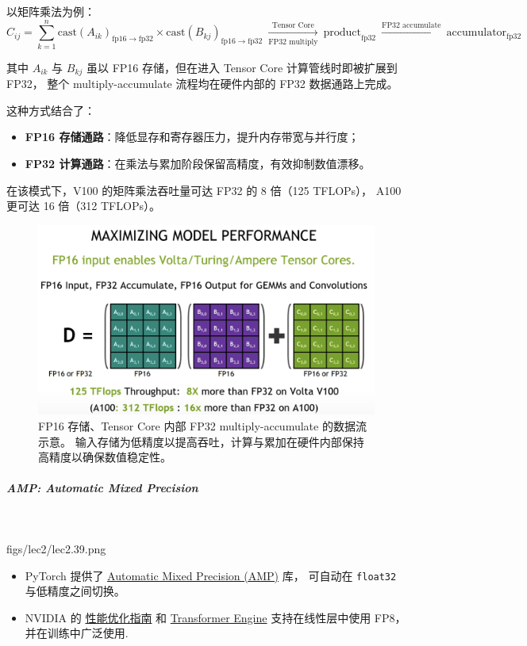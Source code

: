 以矩阵乘法为例：
\[
C_{ij} = \sum_{k=1}^n 
\mathrm{cast}(A_{ik})_{\mathrm{fp16}\to\mathrm{fp32}}
\times
\mathrm{cast}(B_{kj})_{\mathrm{fp16}\to\mathrm{fp32}}
\ \xrightarrow[\text{FP32 multiply}]{\text{Tensor Core}}\ 
\mathrm{product}_{\mathrm{fp32}}
\ \xrightarrow{\text{FP32 accumulate}}\ 
\mathrm{accumulator}_{\mathrm{fp32}}
\]


其中 $A_{ik}$ 与 $B_{kj}$ 虽以 FP16 存储，但在进入 Tensor Core 计算管线时即被扩展到 FP32，
整个 multiply-accumulate 流程均在硬件内部的 FP32 数据通路上完成。

这种方式结合了：
\begin{itemize}[leftmargin=1em]
    \item \textbf{FP16 存储通路}：降低显存和寄存器压力，提升内存带宽与并行度；
    \item \textbf{FP32 计算通路}：在乘法与累加阶段保留高精度，有效抑制数值漂移。
\end{itemize}

在该模式下，V100 的矩阵乘法吞吐量可达 FP32 的 8 倍（125 TFLOPs），
A100 更可达 16 倍（312 TFLOPs）。

\begin{figure}[htbp]
  \centering
  \includegraphics[width=0.8\linewidth]{figs/lec2/lec2.35.png}
  \caption{
    FP16 存储、Tensor Core 内部 FP32 multiply-accumulate 的数据流示意。
    输入存储为低精度以提高吞吐，计算与累加在硬件内部保持高精度以确保数值稳定性。
  }
\label{fig:arithmetic_precision}
\end{figure}


\subparagraph{AMP: Automatic Mixed Precision}~{}

\MarginImageWithNote
  {figs/lec2/lec2.39.png}
  {}




\begin{itemize}
    \item PyTorch 提供了 \href{https://pytorch.org/docs/stable/amp.html}{Automatic Mixed Precision (AMP)} 库，
    可自动在 \texttt{float32} 与低精度之间切换。
    \item NVIDIA 的 \href{https://docs.nvidia.com/deeplearning/performance/mixed-precision-training/}{性能优化指南}
    和 \href{https://docs.nvidia.com/deeplearning/transformer-engine/user-guide/}{Transformer Engine}
    支持在线性层中使用 FP8，并在训练中广泛使用.
\end{itemize}




